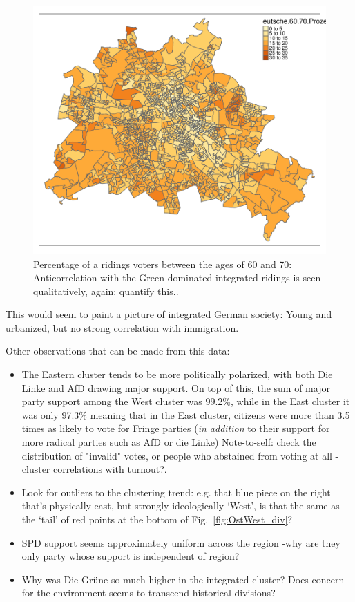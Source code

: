\documentclass[amsmath,amssymb,nofootinbib,12pt,preprint]{revtex4}
\begin{document}
\begin{figure}[h]%
\includegraphics[scale=.65]{../figures/map_60-70}%
\caption{ Percentage of a ridings voters between the ages of 60 and 70: Anticorrelation with the Green-dominated integrated ridings is seen qualitatively, {\color{red} again: quantify this.}.}
\label{fig:map_60-70}%
\end{figure}

This would seem to paint a picture of integrated German society: Young and urbanized, but no strong correlation with immigration.

\clearpage

Other observations that can be made from this data: 
\begin{itemize}
\item The Eastern cluster tends to be more politically polarized, with both Die Linke and AfD drawing major support. On top of this, the sum of major party support among the West cluster was 99.2\%, while in the East cluster it was only 97.3\% meaning that in the East cluster, citizens were more than 3.5 times as likely to vote for Fringe parties (\emph{in addition} to their support for more radical parties such as AfD or die Linke) {\color{red} Note-to-self: check the distribution of "invalid" votes, or people who abstained from voting at all \--cluster correlations with turnout?.}
\item Look for outliers to the clustering trend:  e.g. that blue piece on the right that's physically east, but strongly ideologically `West', is that the same as the `tail' of red points at the bottom of Fig.~\ref{fig:OstWest_div}?
\item SPD support seems approximately uniform across the region \--why are they only party whose support is independent of region?

\item Why was Die Gr\"une so much higher in the integrated cluster?  Does concern for the environment seems to transcend historical divisions?
\end{itemize}
\end{document}
